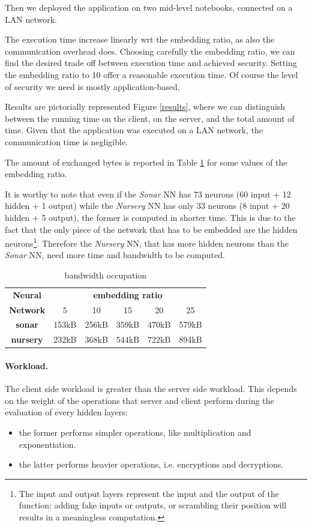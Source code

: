 \documentclass[11pt,oribibl,runningheads]{llncs}
\begin{document}
Then we deployed the application on two mid-level notebooks,
connected on a LAN network.

The execution time increase linearly wrt the embedding ratio, as also the communication overhead does. Choosing carefully the embedding ratio, we can find the desired trade off between execution time and achieved security. Setting the embedding ratio to 10 offer a reasonable execution time. Of course the level of security we need is mostly application-based.

Results are pictorially represented Figure \ref{results}, where we
can distinguish between the running time on the client, on the server, and the total amount of time. Given that the application was executed on a LAN network, the communication time is negligible.

The amount of exchanged bytes is reported in Table \ref{bwo} for some values of the embedding ratio.

It is worthy to note that even if the {\em Sonar} NN has 73 neurons (60 input + 12 hidden + 1 output) while the {\em Nursery} NN has only 33 neurons (8 input + 20 hidden + 5 output), the former is computed in shorter time. This is due to the fact that the only piece of the network that has to be embedded are the hidden neurons\footnote{The input and output layers represent the input and the output of the function: adding fake inputs or outputs, or scrambling their position will results in a meaningless computation.}. Therefore the {\em Nursery} NN, that has more hidden neurons than the {\em Sonar} NN, need more time and bandwidth to be computed.
\begin{table}[h]
\center
\begin{tabular}{|c|c|c|c|c|c|}
\hline
\textbf{Neural} & \multicolumn{5}{|c|}{\textbf{embedding ratio}} \\
\cline{2-6}
\textbf{Network} & 5 & 10 & 15 & 20 & 25 \\
\hline
\textbf{sonar} & 153kB & 256kB & 359kB & 470kB & 579kB \\
\cline{1-1}
\textbf{nursery} & 232kB & 368kB & 544kB & 722kB & 894kB \\
\hline
\end{tabular}
\caption{bandwidth occupation}\label{bwo}
\end{table}


\paragraph{Workload.}
The client side workload is greater than the server side workload. This depends on the weight of the  operations that server and client perform during the evaluation of every hidden layers:
\begin{itemize}
 \item the former performs simpler operations, like multiplication and exponentiation.
 \item the latter performs heavier operations, i.e. encryptions and decryptions.
\end{itemize}
\end{document}
